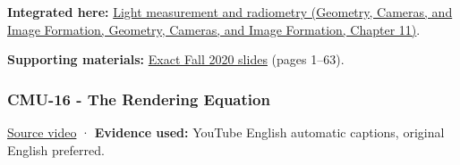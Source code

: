 \textbf{Integrated here:} \href{../03-Geometry-Cameras-and-Image-Formation/main.pdf\#nameddest=03-visual-computing-i-ch004-light-measurement-and-radiometry}{Light measurement and radiometry (Geometry, Cameras, and Image Formation, Geometry, Cameras, and Image Formation, Chapter 11)}.

\textbf{Supporting materials:} \href{https://15462.courses.cs.cmu.edu/fall2020content/lectures/15_radiometry/15_radiometry_slides.pdf}{Exact Fall 2020 slides} (pages 1--63).

\subsubsection{CMU-16 - The Rendering Equation}\label{04-visual-computing-ii-ch036-cmu-16---the-rendering-equation}

\href{https://www.youtube.com/watch?v=Ttxdbn7TSLI}{Source video} · \textbf{Evidence used:} YouTube English automatic captions, original English preferred.

